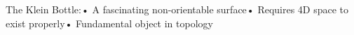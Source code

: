 \documentclass[preview]{standalone}
\begin{document}
\begin{center}
The Klein Bottle:• A fascinating non-orientable surface• Requires 4D space to exist properly• Fundamental object in topology
\end{center}
\end{document}

